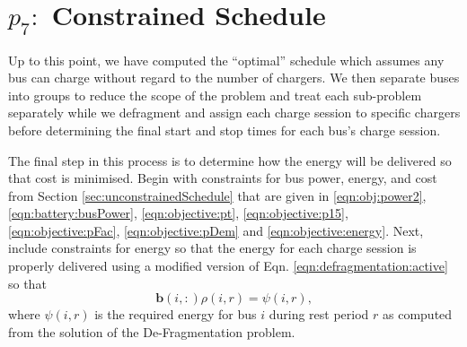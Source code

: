 \section{$p_7:$ Constrained Schedule\label{sec:constrainedSchedule}}
Up to this point, we have computed the ``optimal'' schedule which assumes any bus can charge without regard to the number of chargers. We then separate buses into groups to reduce the scope of the problem and treat each sub-problem separately while we defragment and assign each charge session to specific chargers before determining the final start and stop times for each bus's charge session.
\par The final step in this process is to determine how the energy will be delivered so that cost is minimised. Begin with constraints for bus power, energy, and cost from Section \ref{sec:unconstrainedSchedule} that are given in \eqref{eqn:obj:power2}, \eqref{eqn:battery:busPower}, \eqref{eqn:objective:pt}, \eqref{eqn:objective:p15}, \eqref{eqn:objective:pFac}, \eqref{eqn:objective:pDem} and \eqref{eqn:objective:energy}. Next, include constraints for energy so that the energy for each charge session is properly delivered using a modified version of Eqn. \eqref{eqn:defragmentation:active} so that
\begin{equation}\label{eqn:constrainedSchedule:modified}
	\mathbf{b}(i,:)\rho(i,r) = \psi(i,r),
\end{equation}
where $\psi(i,r)$ is the required energy for bus $i$ during rest period $r$ as computed from the solution of the De-Fragmentation problem.
\\[0.1in] 
